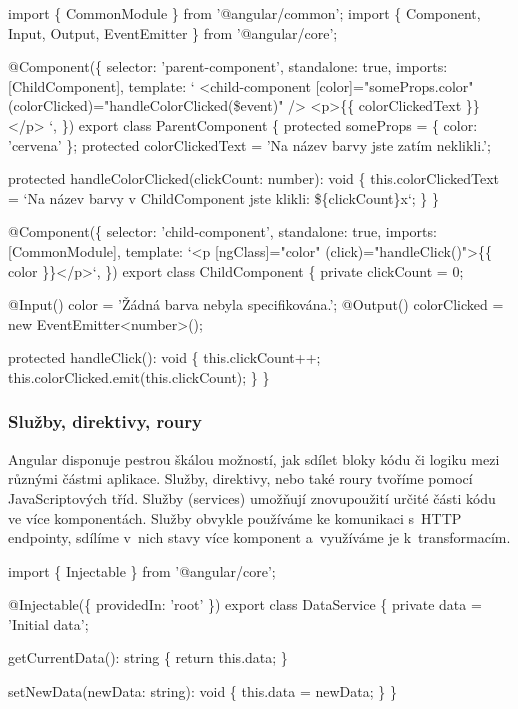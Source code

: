 \begin{prog}
import \{ CommonModule \} from '@angular/common';
import \{ Component, Input, Output, EventEmitter \} from '@angular/core';

@Component(\{
  selector: 'parent-component',
  standalone: true,
  imports: [ChildComponent],
  template: `
    <child-component 
      [color]="someProps.color" 
      (colorClicked)="handleColorClicked(\$event)" 
    />
    <p>\{\{ colorClickedText \}\}</p>
  `,
\})
export class ParentComponent \{
  protected someProps = \{ color: 'cervena' \};
  protected colorClickedText = 'Na název barvy jste zatím neklikli.';

  protected handleColorClicked(clickCount: number): void \{
    this.colorClickedText = `Na název barvy 
      v ChildComponent jste klikli: \$\{clickCount\}x`;
  \}
\}

@Component(\{
  selector: 'child-component',
  standalone: true,
  imports: [CommonModule],
  template: `<p [ngClass]="color" (click)="handleClick()">\{\{ color \}\}</p>`,
\})
export class ChildComponent \{
  private clickCount = 0;

  @Input() color = 'Žádná barva nebyla specifikována.';
  @Output() colorClicked = new EventEmitter<number>();

  protected handleClick(): void \{
    this.clickCount++;
    this.colorClicked.emit(this.clickCount);
  \}
\}
\end{prog}

\subsubsection{Služby, direktivy, roury}

Angular disponuje pestrou škálou možností, jak sdílet bloky kódu či logiku mezi různými částmi aplikace. Služby, direktivy, nebo také roury tvoříme pomocí JavaScriptových tříd. 
Služby (services) umožňují znovupoužití určité části kódu ve více komponentách. 
Služby obvykle používáme ke komunikaci s~HTTP endpointy, sdílíme v~nich stavy více komponent a~využíváme je k~transformacím.\cite{angulardev,learningangular}

\begin{prog}
import \{ Injectable \} from '@angular/core';
  
@Injectable(\{ providedIn: 'root' \})
export class DataService \{
  private data = 'Initial data';

  getCurrentData(): string \{
    return this.data;
  \}
      
  setNewData(newData: string): void \{
    this.data = newData;
  \}
\}
\end{prog}

